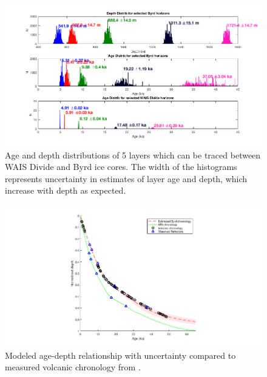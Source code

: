 



\begin{figure}[h]
\centering
\includegraphics[scale=0.5]{figures/agedepthhisto}
\caption[]{Age and depth distributions of 5 layers which can be traced between WAIS Divide and Byrd ice cores. The width of the histograms represents uncertainty in estimates of layer age and depth, which increase with depth as expected. }
\label{fig:layer_agedepth}
\end{figure}

\begin{figure}[h]
\centering
\includegraphics[scale=0.3]{figures/spaghetti}
\caption[]{Modeled age-depth relationship with uncertainty compared to measured volcanic chronology from \citet{hammer97}. }
\label{fig:layer_agedepth}
\end{figure}